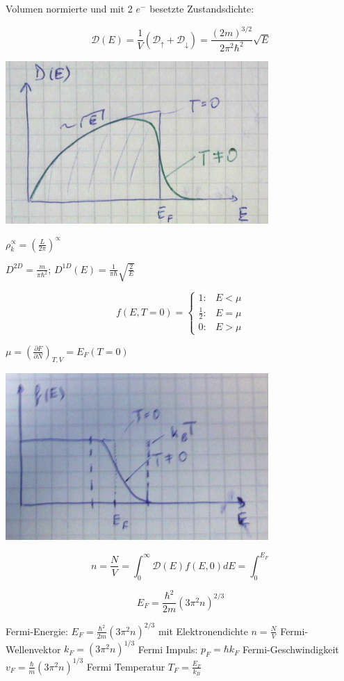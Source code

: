 Volumen normierte und mit 2 \(e^-\) besetzte Zustandsdichte:

\[ \mathcal D(E) = \frac{1}{V} (\mathcal D_\uparrow + \mathcal D_\downarrow) = \frac{(2m)^{3/2}}{2\pi^2\hbar^2}\sqrt{E}\]

\includegraphics[width=0.75\textwidth]{kap06_25.png}

\(\rho^\propto_k=\left(\frac{L}{2\pi}\right)^\propto\)

\(D^{2D}=\frac{m}{\pi \hbar^2}\); \(D^{1D}(E) = \frac{1}{\pi\hbar} \sqrt{\frac{2}{E}}\)

\[f(E,T=0) = \begin{cases}
  1: & E<\mu \\
  \frac{1}{2}: & E=\mu \\
  0: & E>\mu 
\end{cases}
\]

\(\mu = \left(\frac{\partial F}{\partial N}\right)_{T,V}=E_F(T=0)\)

\includegraphics[width=0.75\textwidth]{kap06_26.png}

\[n=\frac{N}{V}=\int_0^\infty \mathcal D(E) f(E,0)dE = \int_0^{E_F}\]

\[E_F = \frac{\hbar^2}{2m}(3\pi^2n)^{2/3}\]

Fermi-Energie: \(E_F = \frac{\hbar^2}{2m}(3\pi^2 n)^{2/3}\) mit Elektronendichte \(n=\frac{N}{V}\)
Fermi-Wellenvektor \(k_F=(3\pi^2n)^{1/3}\)
Fermi Impuls: \(p_F = \hbar k_F\)
Fermi-Geschwindigkeit \(v_F = \frac{\hbar}{m}(3\pi^2 n)^{1/3}\)
Fermi Temperatur \(T_F = \frac{E_F}{k_B}\)


